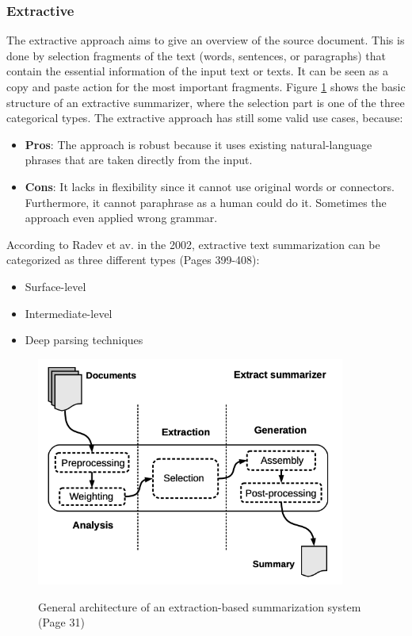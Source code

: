 \subsubsection{Extractive}\label{ss:extractive}
	
The extractive approach aims to give an overview of the source document. This is done by selection fragments of the text (words, sentences, or paragraphs) that contain the essential information of the input text or texts. It can be seen as a copy and paste action for the most important fragments. Figure \ref{extract} shows the basic structure of an extractive summarizer, where the selection part is one of the three categorical types. The extractive approach has still some valid use cases, because:

\begin{itemize}
	\item \textbf{Pros}: The approach is robust because it uses existing natural-language phrases that are taken directly from the input.
	\item \textbf{Cons}: It lacks in flexibility since it cannot use original words or connectors. Furthermore, it cannot paraphrase as a human could do it. Sometimes the approach even applied wrong grammar.
\end{itemize}

According to Radev et av. in the 2002, extractive text summarization can be categorized as three different types \cite{ts-intro} (Pages 399-408):

\begin{itemize}
	\item Surface-level
	\item Intermediate-level
	\item Deep parsing techniques
\end{itemize}

\begin{figure}
	\begin{center}
		\includegraphics[width=4in]{photos/extract}\\
		\caption{General architecture of an extraction-based summarization system \cite{juan} (Page 31)}\label{extract}
	\end{center}
\end{figure}



